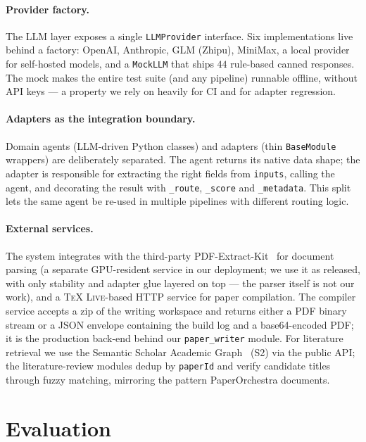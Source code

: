 \documentclass{article}
\newcommand{\code}[1]{\texttt{\small #1}}
\begin{document}
\paragraph{Provider factory.}
The LLM layer exposes a single \code{LLMProvider} interface. Six
implementations live behind a factory: OpenAI, Anthropic, GLM (Zhipu),
MiniMax, a local provider for self-hosted models, and a \code{MockLLM}
that ships $44$ rule-based canned responses. The mock makes the entire
test suite (and any pipeline) runnable offline, without API keys --- a
property we rely on heavily for CI and for adapter regression.

\paragraph{Adapters as the integration boundary.}
Domain agents (LLM-driven Python classes) and adapters (thin
\code{BaseModule} wrappers) are deliberately separated. The agent
returns its native data shape; the adapter is responsible for extracting
the right fields from \code{inputs}, calling the agent, and decorating
the result with \code{\_route}, \code{\_score} and \code{\_metadata}.
This split lets the same agent be re-used in multiple pipelines with
different routing logic.

\paragraph{External services.}
The system integrates with the third-party PDF-Extract-Kit~\cite{pdfextractkit}
for document parsing (a separate GPU-resident service in our deployment;
we use it as released, with only stability and adapter glue layered on
top --- the parser itself is not our work), and a
\textsc{TeX Live}-based HTTP service for paper compilation. The
compiler service accepts a zip of the writing workspace and returns
either a PDF binary stream or a JSON envelope containing the build log
and a base64-encoded PDF; it is the production back-end behind our
\code{paper\_writer} module. For
literature retrieval we use the Semantic Scholar Academic
Graph~\cite{s2ag,s2ods} (S2) via the public API; the literature-review
modules dedup by \code{paperId} and verify candidate titles through
fuzzy matching, mirroring the pattern PaperOrchestra documents.

\section{Evaluation}
\label{sec:eval}
\end{document}
